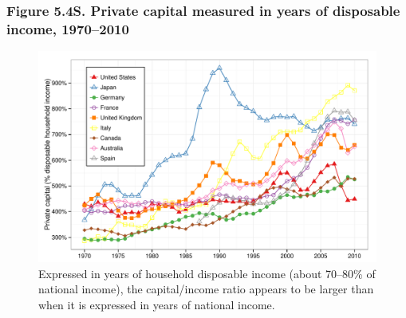\documentclass[t]{beamer}\usepackage[]{graphicx}\usepackage[]{color}
\newenvironment{knitrout}{}{} %
\begin{document}
\begin{frame}[label=Figure_5_4S]
\frametitle{Figure 5.4S. Private capital measured in years of disposable income, 1970--2010}
\begin{figure}[t]
\begin{minipage}[b]{\textwidth}
\centering
\begin{knitrout}\footnotesize
{}\color{fgcolor}

{\centering \includegraphics[width=1\linewidth]{figures/color/Figure_5_4S} 

}



\end{knitrout}
\caption{Expressed in years of household disposable income (about 70--80\% of national income), the capital/income ratio appears to be larger than when it is expressed in years of national income.}
\end{minipage}
\end{figure}
\end{frame}
\end{document}
